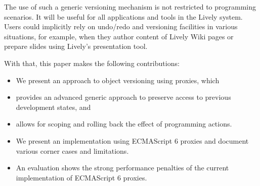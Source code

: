 The use of such a generic versioning mechanism is not restricted to
programming scenarios. It will be useful for all applications and
tools in the Lively system. Users could implicitly rely on undo/redo
and versioning facilities in various situations, for example, when they
author content of Lively Wiki pages or prepare slides using Lively's
presentation tool.

With that, this paper makes the following contributions:
\begin{itemize}
\item We present an approach to object versioning using proxies, which
\item provides an advanced generic approach to preserve access to
  previous development states, and
\item allows for scoping and rolling back the effect of programming
  actions.
\item We present an implementation using ECMAScript 6 proxies and
  document various corner cases and limitations.
\item An evaluation shows the strong performance penalties of the
  current implementation of ECMAScript 6 proxies. 
\end{itemize}



 



